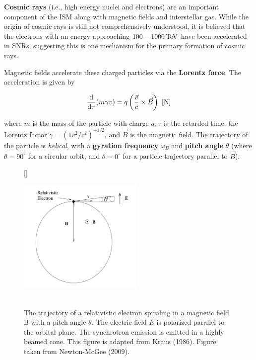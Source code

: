 \documentclass[a4paper,10pt]{article}
\begin{document}
{\noindent}\textbf{Cosmic rays} (i.e., high energy nuclei and electrons) are an important component of the ISM along with magnetic fields and interstellar gas. While the origin of cosmic rays is still not comprehensively understood, it is believed that the electrons with an energy approaching $100-1000\,{\rm TeV}$ have been accelerated in SNRs, suggesting this is one mechanism for the primary formation of cosmic rays.

{\noindent}Magnetic fields accelerate these charged particles via the \textbf{Lorentz force}. The acceleration is given by

\begin{align*}
    \frac{{\rm d}}{{\rm d}\tau}(m\gamma v) = q\left(\frac{\vec{v}}{c}\times\vec{B}\right) ~ [{\rm N}]
\end{align*}

{\noindent}where $m$ is the mass of the particle with charge $q$, $\tau$ is the retarded time, the Lorentz factor  $\gamma=(1 v^2/c^2)^{-1/2}$, and $\vec{B}$ is the magnetic field. The trajectory of the particle is \textit{helical}, with a \textbf{gyration frequency} $\omega_B$ and \textbf{pitch angle} $\theta$ (where $\theta=90^\circ$ for a circular orbit, and $\theta=0^\circ$ for a particle trajectory parallel to $\vec{B}$).

\begin{figure}[h]
    [\FBwidth]
    {\caption{\footnotesize{\\The trajectory of a relativistic electron spiraling in a magnetic field B with a pitch angle $\theta$. The electric field $E$ is polarized parallel to the orbital plane. The synchrotron emission is emitted in a highly beamed cone. This figure is adapted from Kraus (1986). Figure taken from Newton-McGee (2009).}}
    \label{fig:synchrotrondiagram}}
    {\includegraphics[width=6cm]{figures/SynchrotronDiagram.png}}
\end{figure}
\end{document}
